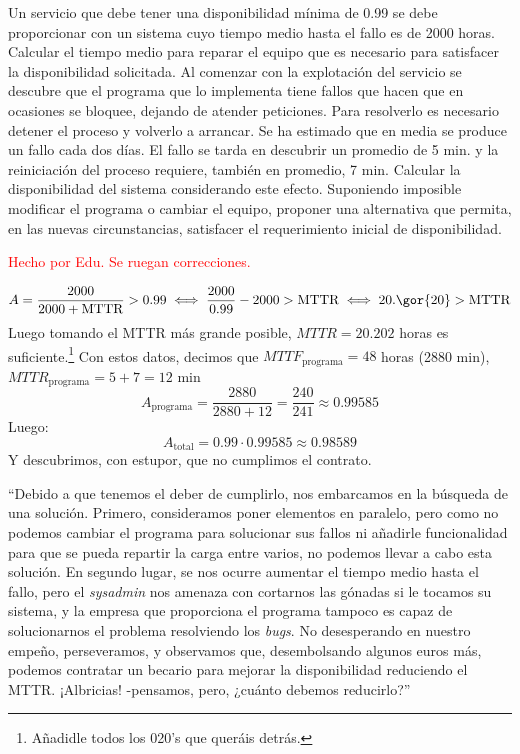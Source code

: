 \begin{problem}[6]
Un  servicio que debe tener una disponibilidad mínima de 0.99 se debe proporcionar con un sistema cuyo tiempo medio hasta el fallo es de 2000 horas.
\ppart
Calcular el tiempo medio para reparar el equipo que es necesario para satisfacer la disponibilidad solicitada.
\ppart
Al comenzar con la explotación del servicio se descubre que el programa que lo implementa tiene fallos que hacen que en ocasiones se bloquee, dejando de atender peticiones. Para resolverlo es necesario detener el proceso y volverlo a arrancar. Se ha estimado que en media se produce un fallo cada dos días. El fallo se tarda en descubrir un promedio de 5 min. y la reiniciación del proceso requiere, también en promedio, 7 min. Calcular la disponibilidad del sistema considerando este efecto.
\ppart
Suponiendo imposible modificar el programa o cambiar el equipo, proponer una alternativa que permita, en las nuevas circunstancias, satisfacer el requerimiento inicial de disponibilidad.

\solution
\textcolor{red}{Hecho por Edu. Se ruegan correcciones.}

\spart
\[ A = \frac{2000}{2000+\text{MTTR}} > 0.99 \iff \frac{2000}{0.99} - 2000 > \text{MTTR} \iff 20.\gor{20} > \text{MTTR} \]
Luego tomando el MTTR más grande posible, $MTTR = 20.202$ horas es suficiente.\footnote{Añadidle todos los 020's que queráis detrás.}
\spart
Con estos datos, decimos que $MTTF_{\text{programa}} = 48$ horas (2880 min), $MTTR_{\text{programa}} = 5+7 = 12$ min
\[ A_{\text{programa}} = \frac{2880}{2880+12} = \frac{240}{241} \approx 0.99585\]
Luego:
\[ A_{\text{total}} = 0.99 \cdot 0.99585 \approx 0.98589 \]
Y descubrimos, con estupor, que no cumplimos el contrato.

\spart
``Debido a que tenemos el deber de cumplirlo, nos embarcamos en la búsqueda de una solución.
Primero, consideramos poner elementos en paralelo, pero como no podemos cambiar el programa para solucionar sus fallos ni añadirle funcionalidad para que se pueda repartir la carga entre varios, no podemos llevar a cabo esta solución. En segundo lugar, se nos ocurre aumentar el tiempo medio hasta el fallo, pero el \textit{sysadmin} nos amenaza con cortarnos las gónadas si le tocamos su sistema, y la empresa que proporciona el programa tampoco es capaz de solucionarnos el problema resolviendo los \textit{bugs}. No desesperando en nuestro empeño, perseveramos, y observamos que, desembolsando algunos euros más, podemos contratar un becario para mejorar la disponibilidad reduciendo el MTTR. ¡Albricias! -pensamos, pero, ¿cuánto debemos reducirlo?''\\


\end{problem}
